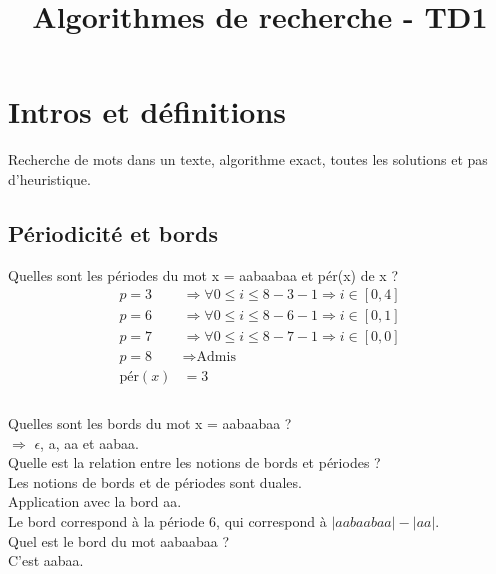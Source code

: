 \documentclass[11pt,a4paper]{article}
\title{Algorithmes de recherche - TD1}
\begin{document}
	
	\maketitle
	
	\section{Intros et définitions}
	
	Recherche de mots dans un texte, algorithme exact, toutes les solutions et pas d'heuristique.\\
	
	\subsection{Périodicité et bords}
	
	Quelles sont les périodes du mot x = aabaabaa et pér(x) de x ?
	\begin{align*}
		p = 3 &\Rightarrow \forall 0 \leq i \leq 8 - 3 - 1 \Rightarrow i \in [0, 4]\\
		p = 6 &\Rightarrow \forall 0 \leq i \leq 8 - 6 - 1 \Rightarrow i \in [0, 1]\\
		p = 7 &\Rightarrow \forall 0 \leq i \leq 8 - 7 - 1 \Rightarrow i \in [0, 0]\\
		p = 8 &\Rightarrow \text{Admis}\\
		\text{pér}(x) &= 3\\
	\end{align*}
	\\
	
	Quelles sont les bords du mot x = aabaabaa ?\\
	$\Rightarrow$ $\epsilon$, a, aa et aabaa.\\
	
	Quelle est la relation entre les notions de bords et périodes ?\\
	Les notions de bords et de périodes sont duales.\\
	
	Application avec la bord aa.\\
	Le bord correspond à la période 6, qui correspond à $|aabaabaa| - |aa|$.\\
	
	Quel est le bord du mot aabaabaa ?\\
	C'est aabaa.\\
	
	\newpage
	
\end{document}
